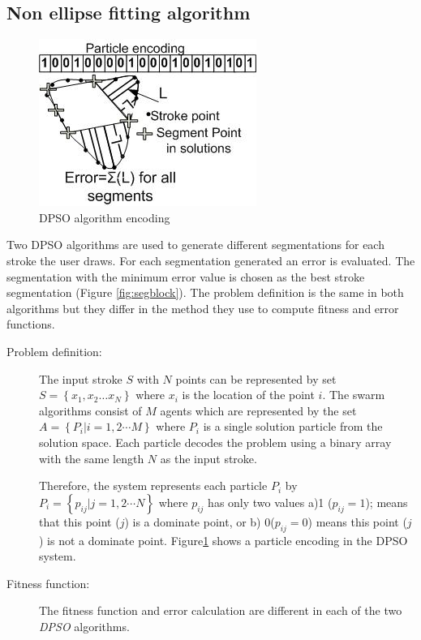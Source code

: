 \documentclass{article}
\begin{document}
\subsection{Non ellipse fitting algorithm}
\label{subsubsec:Discreteparticleswarmalgorithm}
\begin{figure}
	\centering
	 \includegraphics[scale=0.7]{images/pso1.jpg}			
	\caption{DPSO algorithm encoding}%
	\label{fig:pso1}
\end{figure}
Two DPSO algorithms are used to generate different segmentations for each stroke the user draws. For each segmentation generated an error is evaluated. The segmentation with the minimum error value is chosen as the best stroke segmentation (Figure \ref{fig:segblock}). The problem definition is the same in both algorithms but they differ in the method they use to compute fitness and error functions. 
\begin{description}
	\item[ Problem definition:] The input stroke $S$  with $N$ points can be represented by set $S = \left\{ {x_1 ,x_2  \ldots x_N }\right\}$ where $x_i$ is the location of the point $i$. The swarm algorithms consist of $M$ agents which are represented by the set $A = \left\{ {P_i \left| {i = 1,2 \cdots M} \right.} \right\}$ where $P_i$ is a single solution particle from the solution space. Each particle decodes the problem using a binary array with the same length $N$ as the input stroke.  

Therefore, the system represents each particle $P_i$ by $P_i = \left\{ {p_{ij} \left| {j = 1,2 \cdots N} \right.} \right\}$ where $p_{ij}$ has only two values a)1 ($p_{ij}=1$); means that this point ($j$) is a dominate point, or b) 0($p_{ij}=0$) means this point ($j$) is not a dominate point. Figure\ref{fig:pso1} shows a particle encoding in the DPSO system. 

	\item[Fitness function:] The fitness function and error calculation are different in each of the two \textit{DPSO} algorithms. 
	\end{description}
\end{document}
